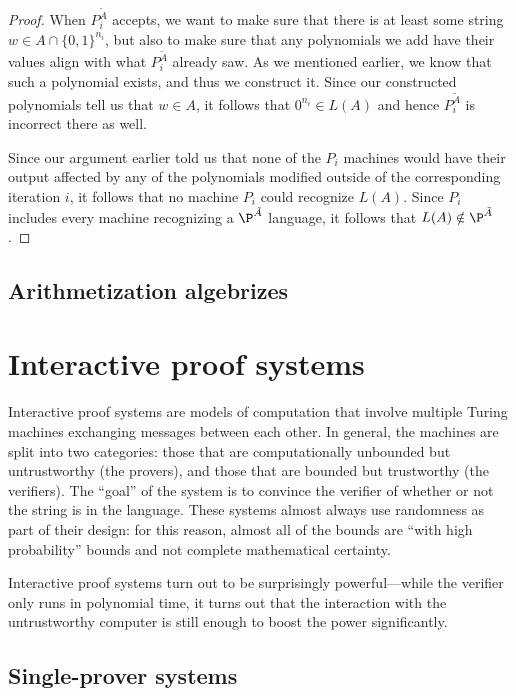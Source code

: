 \documentclass[english]{reedthesis}
\theoremstyle{plain}
\theoremstyle{definition}
\theoremstyle{remark}
\begin{document}
\begin{proof}
  When $P_{i}^{\tilde{A}}$ accepts, we want to make sure that there is at least
  some string $w \in A \cap \{0, 1\}^{n_{i}}$, but also to make sure that any
  polynomials we add have their values align with what $P_{i}^{\tilde{A}}$
  already saw. As we mentioned earlier, we know that such a polynomial exists,
  and thus we construct it. Since our constructed polynomials tell us that
  $w \in A$, it follows that $0^{n_{i}} \in L(A)$ and hence $P_{i}^{\tilde{A}}$ is
  incorrect there as well.

  Since our argument earlier told us that none of the $P_{i}$ machines would
  have their output affected by any of the polynomials modified outside of the
  corresponding iteration $i$, it follows that no machine $P_{i}$ could
  recognize $L(A)$. Since $P_{i}$ includes every machine recognizing a
  $\P^{\tilde{A}}$ language, it follows that $L(A) \notin \P^{\tilde{A}}$.
\end{proof}

\section{Arithmetization algebrizes}\label{sec:arith-algebrizes}


\chapter{Interactive proof systems}\label{chap:ips}

Interactive proof systems are models of computation that involve multiple Turing
machines exchanging messages between each other. In general, the machines are
split into two categories: those that are computationally unbounded but
untrustworthy (the provers), and those that are bounded but trustworthy (the
verifiers). The ``goal'' of the system is to convince the verifier of whether or
not the string is in the language. These systems almost always use randomness as
part of their design: for this reason, almost all of the bounds are ``with high
probability'' bounds and not complete mathematical certainty.

Interactive proof systems turn out to be surprisingly powerful---while the
verifier only runs in polynomial time, it turns out that the interaction with
the untrustworthy computer is still enough to boost the power significantly.

\section{Single-prover systems}\label{sec:zero-prover}
\end{document}
